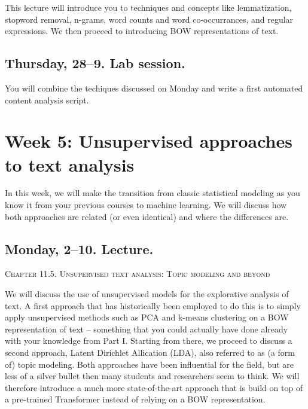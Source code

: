 This lecture will introduce you to techniques and concepts like lemmatization, stopword removal, n-grams, word counts and word co-occurrances, and regular expressions. We then proceed to introducing BOW representations of text.



\subsection*{Thursday, 28--9. Lab session.}
You will combine the techiques discussed on Monday and write a first automated content analysis script.




\section*{Week 5: Unsupervised approaches to text analysis}
In this week, we will make the transition from classic statistical modeling as you know it from your previous courses to machine learning. We will discuss how both approaches are related  (or even identical) and where the differences are.

\subsection*{Monday, 2--10. Lecture.}
\textsc{ Chapter 11.5. Unsupervised text analysis: Topic modeling and beyond}\\
\textsc{  \cite{Maier2018a} }

We will discuss the use of unsupervised models for the explorative analysis of text.
A first approach that has historically been employed to do this is to simply apply unsupervised methods such as PCA and k-means clustering on a BOW representation of text -- something that you could actually have done already with your knowledge from Part I. Starting from there, we proceed to discuss a second approach, Latent Dirichlet Allication (LDA), also referred to as (a form of) topic modeling.
Both approaches have been influential for the field, but are less of a silver bullet then many students and researchers seem to think. We will therefore introduce a much more state-of-the-art approach that is build on top of a pre-trained Transformer instead of relying on a BOW representation.

